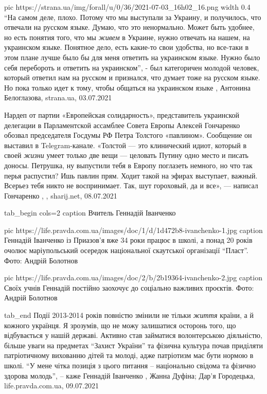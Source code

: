 \ifcmt
  pic https://strana.ua/img/forall/u/0/36/2021-07-03_16h02_16.png
  width 0.4
\fi
\enquote{На самом деле, плохо. Потому что мы выступали за Украину, и получилось, что
отвечали на русском языке. Думаю, что это ненормально. Может быть удобнее, но
есть понятия того, что мы \emph{живем} в Украине, нужно отвечать на нашем, на
украинском языке. Понятное дело, есть какие-то свои удобства, но все-таки в
этом плане лучше было бы для меня ответить на украинском языке. Нужно было себя
перебороть и ответить на украинском}, - был категоричен молодой человек,
который ответил нам на русском и признался, что думает тоже на русском языке.
Но пока только идет к тому, чтобы общаться на украинском языке
, 
Антонина Белоглазова, strana.ua, 03.07.2021


Нардеп от партии «Европейская солидарность», представитель украинской делегации
в Парламентской ассамблее Совета Европы Алексей Гончаренко обозвал председателя
Госдумы РФ Петра Толстого «павлином». Сообщение он выставил в Telegram-канале.
«Толстой — это клинический идиот, который в своей \emph{жизни} умеет только две вещи —
целовать Путину одно место и писать доносы. Петрушка, ну выпустили тебя в
Европу поглазеть немного, но что так перья распустил? Ишь павлин прям. Ходит
такой на эфирах выступает, важный. Всерьез тебя никто не воспринимает. Так, шут
гороховый, да и все», — написал Гончаренко
, 
, sharij.net, 08.07.2021

\ifcmt
  tab_begin cols=2
     caption Вчитель Геннадій Іванченко

     pic https://life.pravda.com.ua/images/doc/1/d/1d472b8-ivanchenko-1.jpg
     caption Геннадій Іванченко із Приазов'я вже 34 роки працює в школі, а понад 20 років очолює маріупольський осередок національної скаутської організації \enquote{Пласт}. Фото: Андрій Болотнов

     pic https://life.pravda.com.ua/images/doc/2/b/2b19364-ivanchenko-2.jpg
     caption Своїх учнів Геннадій постійно заохочує до соціально важливих проєктів. Фото: Андрій Болотнов

  tab_end
\fi
Події 2013-2014 років повністю змінили не тільки \emph{життя} країни, а й кожного
українця. Я зрозумів, що не можу залишатися осторонь того, що відбувається у
нашій державі.  Активно став займатися волонтерською діяльністю, більше уваги
на предметах \enquote{Захист України} та фізична культура почав приділяти патріотичному
вихованню дітей та молоді, адже патріотизм має бути нормою в школі.  \enquote{У мене
чітка позиція з цього питання – національно свідома та фізично здорова молодь},
– каже Геннадій Іванченко
, 
Жанна Дуфіна; Дар'я Городецька, life.pravda.com.ua, 09.07.2021

